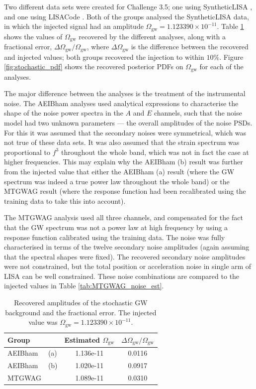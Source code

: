 \documentclass{iopart}
\begin{document}
Two different data sets were created for Challenge 3.5; one using 
SyntheticLISA \cite{}, and one using LISACode \cite{}. Both of the groups 
analysed the SyntheticLISA data, in which the injected signal had
an amplitude
$\Omega_{\mathrm{gw}}=1.123390\times 10^{-11}$. Table \ref{tab:SGWB_recovered}
shows the values of $\Omega_{\mathrm{gw}}$ recovered by the different
analyses, along with a fractional error, 
$\Delta \Omega_{\mathrm{gw}}/\Omega_{\mathrm{gw}}$,
where $\Delta \Omega_{\mathrm{gw}}$ is the difference between the recovered
and injected values; both groups recovered the injection
to within $10\%$. 
Figure \ref{fig:stochastic_pdf} shows the recovered posterior PDFs on 
$\Omega_{\mathrm{gw}}$ for each of the analyses. 

The major difference between the analyses is the treatment of the instrumental
noise. 
The AEIBham analyses 
used analytical expressions to characterise the shape of the noise power spectra
in the $A$ and $E$ channels, such that the noise model had two unknown parameters ---
the overall amplitudes of the noise PSDs.
For this it was assumed that the secondary noises were symmetrical,
which was not true of these data sets. It was also assumed that the strain spectrum was
proportional to $f^3$ throughout the whole band, which was not in fact the case at higher frequencies. This
may explain why the AEIBham (b) result was further from the injected
value that either the AEIBham (a) result (where the GW spectrum was indeed
a true power law throughout the whole band) or the MTGWAG result (where the 
response function had been recalibrated using the training data to take 
this into account).

The MTGWAG analysis used all three channels, and compensated for the fact that the
GW spectrum was not a power law at high frequency by using a response function
calibrated using the training data. The noise was fully characterised 
in terms of the twelve secondary noise amplitudes (again assuming that the 
spectral shapes were fixed). The recovered secondary noise amplitudes 
were not constrained, but the total position or acceleration noise
in single arm of LISA can be well constrained. 
These noise combinations are compared to the injected
values in Table \ref{tab:MTGWAG_noise_est}. 

\begin{table}
\begin{center}
\begin{tabular}{l@{ }l|cc}
\hline
Group & & Estimated $\Omega_{\mathrm{gw}}$ & $\Delta \Omega_{\mathrm{gw}} / \Omega_{\mathrm{gw}}$ \\
\hline
AEIBham & (a) & 1.136e-11 & 0.0116 \\ 
AEIBham & (b) & 1.020e-11 & 0.0917 \\ 
\hline
MTGWAG &  & 1.089e-11 & 0.0310 \\ 
\hline
\end{tabular}
\end{center}
\caption{Recovered amplitudes of the stochastic GW background and the fractional
error. The injected value was $\Omega_{\mathrm{gw}}=1.123390\times 10^{-11}$.
\label{tab:SGWB_recovered}
}
\end{table} 
\end{document}
